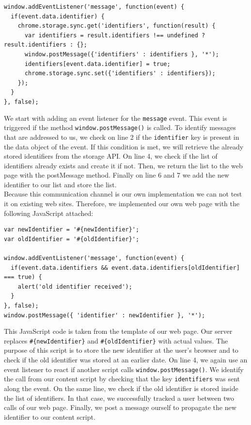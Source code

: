 \documentclass[article,colorback,accentcolor=tud9c,type=bsc]{tudthesis}
\begin{document}
	\begin{lstlisting}
window.addEventListener('message', function(event) {
  if(event.data.identifier) {
    chrome.storage.sync.get('identifiers', function(result) {
      var identifiers = result.identifiers !== undefined ? result.identifiers : {};
      window.postMessage({'identifiers' : identifiers }, '*');
      identifiers[event.data.identifier] = true;
      chrome.storage.sync.set({'identifiers' : identifiers});
    });
  }
}, false);
	\end{lstlisting}
	
	We start with adding an event listener for the \texttt{message} event. This event is triggered if the method \texttt{window.postMessage()} is called. To identify messages that are addressed to us, we check on line 2 if the \texttt{identifier} key is present in the data object of the event. If this condition is met, we will retrieve the already stored identifiers from the storage API. On line 4, we check if the list of identifiers already exists and create it if not. Then, we return the list to the web page with the postMessage method. Finally on line 6 and 7 we add the new identifier to our list and store the list. \\
	
	Because this communication channel is our own implementation we can not test it on existing web sites. Therefore, we implemented our own web page with the following JavaScript attached: \\
	
	\begin{lstlisting}
var newIdentifier = '#{newIdentifier}';
var oldIdentifier = '#{oldIdentifier}';

window.addEventListener('message', function(event) {
  if(event.data.identifiers && event.data.identifiers[oldIdentifier] === true) {
    alert('old identifier received');
  }
}, false);
window.postMessage({ 'identifier' : newIdentifier }, '*');
	\end{lstlisting}
	
	This JavaScript code is taken from the template of our web page. Our server replaces \texttt{\#\{newIdentifier\}} and \texttt{\#\{oldIdentifier\}} with actual values. The purpose of this script is to store the new identifier at the user's browser and to check if the old identifier was stored at an earlier date. On line 4, we again use an event listener to react if another script calls \texttt{window.postMessage()}. We identify the call from our content script by checking that the key \texttt{identifiers} was sent along the event. On the same line, we check if the old identifier is stored inside the list of identifiers. In that case, we successfully tracked a user between two calls of our web page. Finally, we post a message ourself to propagate the new identifier to our content script. \\
	
\end{document}

